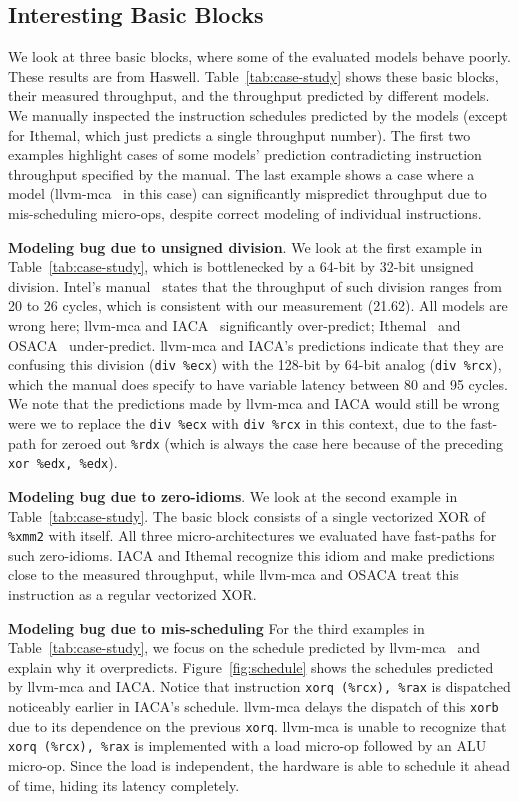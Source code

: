 \subsection{Interesting Basic Blocks}
We look at three basic blocks, where some of the evaluated models behave poorly.
These results are from Haswell.
Table~\ref{tab:case-study} shows these basic blocks, their 
measured throughput, and the throughput predicted by different models.
We manually inspected the instruction schedules predicted by the models
(except for Ithemal, which just predicts a single throughput number).
The first two examples highlight cases of some models' prediction
contradicting instruction throughput specified by the manual.
The last example shows a case where a model (llvm-mca~\cite{llvm-mca} in this case) can significantly
mispredict throughput due to mis-scheduling micro-ops, despite correct modeling of individual instructions.

\textbf{Modeling bug due to unsigned division}.
We look at the first example in Table~\ref{tab:case-study},
which is bottlenecked by a 64-bit by 32-bit unsigned division.
Intel's manual~\cite{intel-manual} states that the throughput of such division
ranges from 20 to 26 cycles, which is consistent with our measurement (21.62).
All models are wrong here; llvm-mca and IACA~\cite{iaca} significantly over-predict;
Ithemal~\cite{ithemal} and OSACA~\cite{osaca} under-predict.
llvm-mca and IACA's predictions indicate that they are confusing 
this division (\verb|div %ecx|) with the 128-bit by 64-bit analog (\verb|div %rcx|),
which the manual does specify to have variable latency between 80 and 95 cycles.
We note that the predictions made by llvm-mca and IACA would still be wrong
were we to replace the \verb|div %ecx| with \verb|div %rcx| in this context,
due to the fast-path for zeroed out \verb|%rdx|
(which is always the case here because of the preceding \verb|xor %edx, %edx|).

\textbf{Modeling bug due to zero-idioms}.
We look at the second example in Table~\ref{tab:case-study}.
The basic block consists of a single vectorized XOR of \verb|%xmm2| with itself.
All three micro-architectures we evaluated have fast-paths for such zero-idioms. 
IACA and Ithemal recognize this idiom and make predictions close to the measured throughput,
while llvm-mca and OSACA treat this instruction as a regular vectorized XOR.

\textbf{Modeling bug due to mis-scheduling}
For the third examples in Table~\ref{tab:case-study}, 
we focus on the schedule predicted by llvm-mca~\cite{llvm-mca}
and explain why it overpredicts.
Figure~\ref{fig:schedule} shows the schedules predicted by llvm-mca and IACA.
Notice that instruction \verb|xorq (%rcx), %rax| is dispatched
noticeably earlier in IACA's schedule.
llvm-mca delays the dispatch of this \verb|xorb| due to its dependence on the previous \verb|xorq|.
llvm-mca is unable to recognize that 
\verb|xorq (%rcx), %rax| is implemented with a load micro-op followed by an ALU micro-op.
Since the load is independent, the hardware is able to schedule it ahead of time,
hiding its latency completely.


